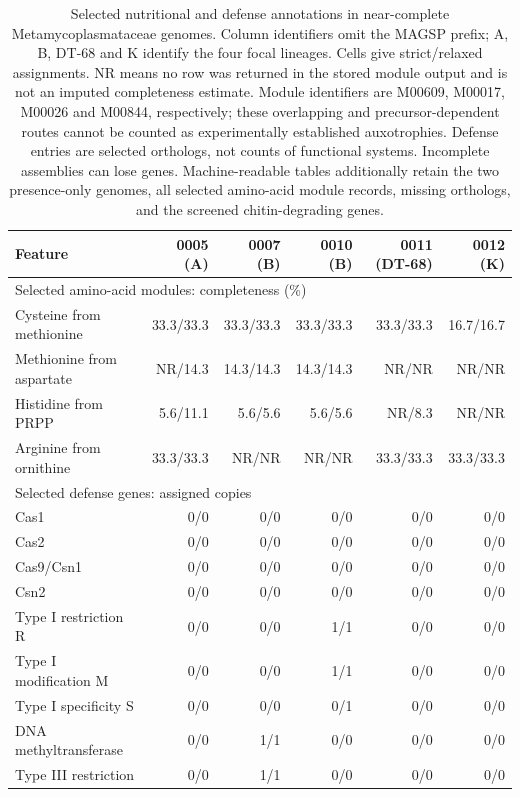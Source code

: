 \begin{table}[p]\centering\footnotesize
\setlength{\tabcolsep}{4pt}
\begin{tabular}{lrrrrr}\toprule
Feature & 0005 (A) & 0007 (B) & 0010 (B) & 0011 (DT-68) & 0012 (K) \\\midrule
\multicolumn{6}{l}{Selected amino-acid modules: completeness (\%)} \\
Cysteine from methionine & 33.3/33.3 & 33.3/33.3 & 33.3/33.3 & 33.3/33.3 & 16.7/16.7 \\
Methionine from aspartate & NR/14.3 & 14.3/14.3 & 14.3/14.3 & NR/NR & NR/NR \\
Histidine from PRPP & 5.6/11.1 & 5.6/5.6 & 5.6/5.6 & NR/8.3 & NR/NR \\
Arginine from ornithine & 33.3/33.3 & NR/NR & NR/NR & 33.3/33.3 & 33.3/33.3 \\
\midrule\multicolumn{6}{l}{Selected defense genes: assigned copies} \\
Cas1 & 0/0 & 0/0 & 0/0 & 0/0 & 0/0 \\
Cas2 & 0/0 & 0/0 & 0/0 & 0/0 & 0/0 \\
Cas9/Csn1 & 0/0 & 0/0 & 0/0 & 0/0 & 0/0 \\
Csn2 & 0/0 & 0/0 & 0/0 & 0/0 & 0/0 \\
Type I restriction R & 0/0 & 0/0 & 1/1 & 0/0 & 0/0 \\
Type I modification M & 0/0 & 0/0 & 1/1 & 0/0 & 0/0 \\
Type I specificity S & 0/0 & 0/0 & 0/1 & 0/0 & 0/0 \\
DNA methyltransferase & 0/0 & 1/1 & 0/0 & 0/0 & 0/0 \\
Type III restriction & 0/0 & 1/1 & 0/0 & 0/0 & 0/0 \\
\bottomrule\end{tabular}
\caption{Selected nutritional and defense annotations in near-complete Metamycoplasmataceae genomes. Column identifiers omit the MAGSP prefix; A, B, DT-68 and K identify the four focal lineages. Cells give strict/relaxed assignments. NR means no row was returned in the stored module output and is not an imputed completeness estimate. Module identifiers are M00609, M00017, M00026 and M00844, respectively; these overlapping and precursor-dependent routes cannot be counted as experimentally established auxotrophies. Defense entries are selected orthologs, not counts of functional systems. Incomplete assemblies can lose genes. Machine-readable tables additionally retain the two presence-only genomes, all selected amino-acid module records, missing orthologs, and the screened chitin-degrading genes.}
\label{tab:nutrition-defense}\end{table}
